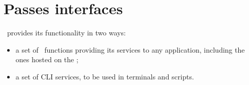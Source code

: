 



\chapter{Passes interfaces}

\mf\ provides its functionality in two ways:
\begin{itemize}
\item a set of \API\ functions providing its services to any application, including the ones hosted on the \Web;
\item a set of CLI services, to be used in terminals and scripts.
\end{itemize}

